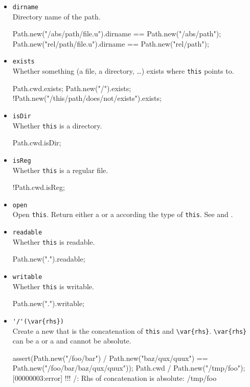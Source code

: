 \begin{itemize}
\item \lstinline|dirname|\\
  Directory name of the path.
\begin{urbiassert}
Path.new("/abs/path/file.u").dirname == Path.new("/abs/path");
Path.new("rel/path/file.u").dirname  == Path.new("rel/path");
\end{urbiassert}

\item \lstinline|exists|\\
  Whether something (a file, a directory, \ldots) exists where
  \lstinline|this| points to.
\begin{urbiassert}
Path.cwd.exists;
Path.new("/").exists;
!Path.new("/this/path/does/not/exists").exists;
\end{urbiassert}

\item \lstinline|isDir|\\
  Whether \lstinline|this| is a directory.
\begin{urbiassert}
Path.cwd.isDir;
\end{urbiassert}

\item \lstinline|isReg|\\
  Whether \lstinline|this| is a regular file.
\begin{urbiassert}
!Path.cwd.isReg;
\end{urbiassert}

\item \lstinline|open|\\
  Open \lstinline|this|. Return either a  or a
   according the type of \lstinline|this|. See
   and .

\item \lstinline|readable|\\
  Whether \lstinline|this| is readable.
\begin{urbiassert}
Path.new(".").readable;
\end{urbiassert}

\item \lstinline|writable|\\
  Whether \lstinline|this| is writable.
\begin{urbiassert}
Path.new(".").writable;
\end{urbiassert}

\item \lstinline|'/'(\var{rhs})|\\
  Create a new  that is the concatenation of
  \lstinline|this| and \lstinline|\var{rhs}|. \lstinline|\var{rhs}|
  can be a  or a  and cannot be absolute.
\begin{urbiscript}
assert(Path.new("/foo/bar") / Path.new("baz/qux/quux")
       == Path.new("/foo/bar/baz/qux/quux"));
Path.cwd / Path.new("/tmp/foo");
[00000003:error] !!! /: Rhs of concatenation is absolute: /tmp/foo
\end{urbiscript}


\end{itemize}

